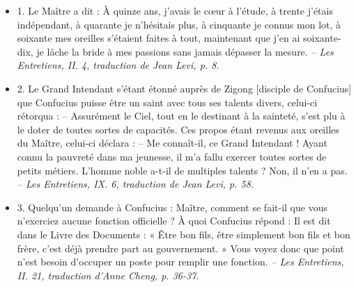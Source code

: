 \begin{itemize}
     \item  1. \newline Le Maître a dit : À quinze ans, j’avais le cœur à l’étude, à trente j’étais indépendant, à quarante je n’hésitais plus, à cinquante je connus mon lot, à soixante mes oreilles s’étaient faites à tout, maintenant que j’en ai soixante-dix, je lâche la bride à mes passions sans jamais dépasser la mesure.   \textit{\small -- Les Entretiens, II. 4, traduction de Jean Levi, p. 8.  } 
\item 2. \newline Le Grand Intendant s’étant étonné auprès de Zigong [disciple de Confucius] que Confucius puisse être un saint avec tous ses talents divers, celui-ci rétorqua :  -- Assurément le Ciel, tout en le destinant à la sainteté, s’est plu à le doter de toutes sortes de capacités. Ces propos étant revenus aux oreilles du Maître, celui-ci déclara :  \newline -- Me connaît-il, ce Grand Intendant ! Ayant connu la pauvreté dans ma jeunesse, il m’a fallu exercer toutes sortes de petits métiers. L’homme noble a-t-il de multiples talents ? Non, il n’en a pas.  \textit{\small -- Les Entretiens, IX. 6, traduction de Jean Levi, p. 58.  }
\item 3. \newline Quelqu’un demande à Confucius : Maître, comment se fait-il que vous n’exerciez aucune fonction officielle ?  À quoi Confucius répond : \newline Il est dit dans le Livre des Documents : « Être bon fils, être simplement bon fils et bon frère, c’est déjà prendre part au gouvernement. » Vous voyez donc que point n’est besoin d’occuper un poste pour remplir une fonction.  \textit{\small -- Les Entretiens, II. 21, traduction d’Anne Cheng, p. 36-37.  
}

\end{itemize}
